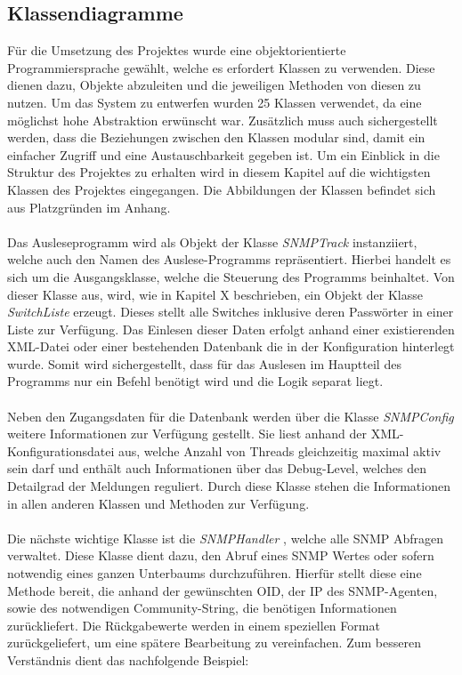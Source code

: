 \subsection{Klassendiagramme}
\label{subsec:classdiagrams}

Für die Umsetzung des Projektes wurde eine objektorientierte Programmiersprache gewählt, welche es erfordert Klassen zu verwenden.
Diese dienen dazu, Objekte abzuleiten und die jeweiligen Methoden von diesen zu nutzen.
Um das System zu entwerfen wurden 25 Klassen verwendet, da eine möglichst hohe Abstraktion erwünscht war.
Zusätzlich muss auch sichergestellt werden, dass die Beziehungen zwischen den Klassen modular sind, damit ein einfacher Zugriff und eine Austauschbarkeit gegeben ist.
Um ein Einblick in die Struktur des Projektes zu erhalten wird in diesem Kapitel auf die wichtigsten Klassen des Projektes eingegangen.
Die Abbildungen der Klassen befindet sich aus Platzgründen im Anhang.\\\\
Das Ausleseprogramm wird als Objekt der Klasse \textit{SNMPTrack} instanziiert, welche auch den Namen des Auslese-Programms repräsentiert.
Hierbei handelt es sich um die Ausgangsklasse, welche die Steuerung des Programms beinhaltet. Von dieser Klasse aus, wird, wie in Kapitel X beschrieben, ein Objekt der Klasse \textit{SwitchListe} erzeugt.
Dieses stellt alle Switches inklusive deren Passwörter in einer Liste zur Verfügung.
Das Einlesen dieser Daten erfolgt anhand einer existierenden XML-Datei oder einer bestehenden Datenbank die in der Konfiguration hinterlegt wurde.
Somit wird sichergestellt, dass für das Auslesen im Hauptteil des Programms nur ein Befehl benötigt wird und die Logik separat liegt.\\\\
Neben den Zugangsdaten für die Datenbank werden über die Klasse \textit{SNMPConfig} weitere Informationen zur Verfügung gestellt.
Sie liest anhand der XML-Konfigurationsdatei aus, welche Anzahl von Threads gleichzeitig maximal aktiv sein darf und enthält auch Informationen über das Debug-Level, welches den Detailgrad der Meldungen reguliert.
Durch diese Klasse stehen die Informationen in allen anderen Klassen und Methoden zur Verfügung.\\\\
Die nächste wichtige Klasse ist die \textit{SNMPHandler} , welche alle SNMP Abfragen verwaltet.
Diese Klasse dient dazu, den Abruf eines SNMP Wertes oder sofern notwendig eines ganzen Unterbaums durchzuführen.
Hierfür stellt diese eine Methode bereit, die anhand der gewünschten OID, der IP des SNMP-Agenten, sowie des notwendigen Community-String, die benötigen Informationen  zurückliefert.
Die Rückgabewerte werden in einem speziellen Format zurückgeliefert, um eine spätere Bearbeitung zu vereinfachen. Zum besseren Verständnis dient das nachfolgende Beispiel:\\

